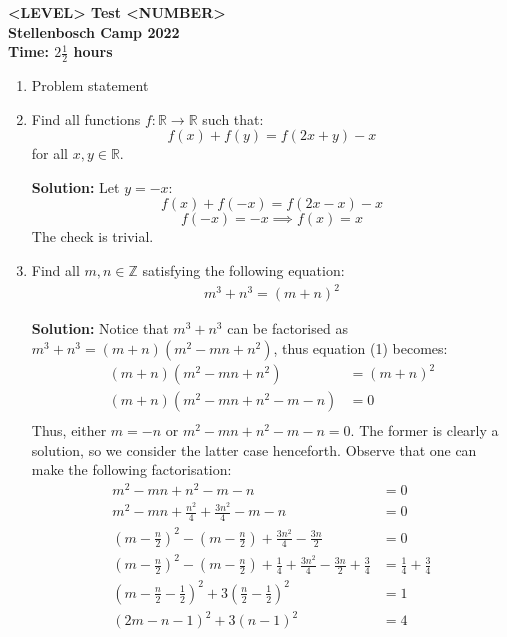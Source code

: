 \documentclass{article}
\begin{document}
\thispagestyle{empty}

\begin{center}
  \textbf{\Large <LEVEL> Test <NUMBER>}
  \\ \vspace{1em}
  \textbf{\large Stellenbosch Camp 2022}
  \\ \vspace{1em}
  \textbf{\large Time: $2\frac{1}{2}$ hours}
\end{center}


\begin{enumerate}[itemsep=\fill]

\item %
Problem statement


\item %
Find all functions $f:\mathbb{R}\to\mathbb{R}$ such that:
\[f(x) + f(y) = f(2x+y) - x\] for all $x,y\in\mathbb{R}$.

\textbf{Solution:} Let $y = -x$:
\[f(x) + f(-x) = f(2x-x) - x\]
\[f(-x) = -x\implies f(x) = x\]
The check is trivial.

\item 
Find all $m,n\in \mathbb{Z}$ satisfying the following equation:
\begin{align}
m^3 + n^3 = (m+n)^2 
\end{align}

\textbf{Solution:} Notice that $m^3 + n^3$ can be factorised as $m^3 + n^3=(m+n)(m^{2} -mn + n^{2})$, thus equation (1) becomes:
\begin{align*}
    (m+n)(m^{2} -mn + n^{2}) & = (m+n)^2\\
    (m+n)(m^{2} -mn + n^{2} -m -n) & = 0 \\
\end{align*}
Thus, either $m = -n$ or $m^{2} -mn + n^{2} -m -n = 0$. The former is clearly a solution, so we consider the latter case henceforth. Observe that one can make the following factorisation:
\begin{align}
    m^{2} -mn + n^{2} -m -n & = 0 \nonumber\\ 
    m^{2} - mn + \frac{n^{2}}{4} + \frac{3n^{2}}{4} - m -n & = 0 \nonumber\\
    \left(m - \frac{n}{2}\right)^{2} - \left(m - \frac{n}{2}\right) + \frac{3n^{2}}{4} - \frac{3n}{2} & = 0 \nonumber\\
    \left(m - \frac{n}{2}\right)^{2} - \left(m - \frac{n}{2}\right) + \frac{1}{4} + \frac{3n^{2}}{4} - \frac{3n}{2} + \frac{3}{4} & = \frac{1}{4} +\frac{3}{4} \nonumber\\
    \left(m - \frac{n}{2} - \frac{1}{2}\right)^{2} +3\left(\frac{n}{2} - \frac{1}{2}\right)^{2} & = 1 \nonumber\\
    (2m - n - 1)^{2} + 3(n-1)^{2} & = 4 
\end{align}


\end{enumerate}
\end{document}
